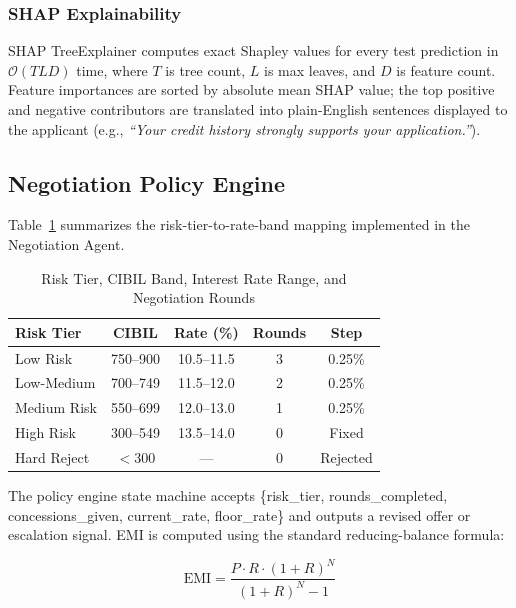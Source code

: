 \documentclass[conference]{IEEEtran}
\begin{document}
\subsubsection{SHAP Explainability}

SHAP TreeExplainer computes exact Shapley values for
every test prediction in $\mathcal{O}(TLD)$ time, where
$T$ is tree count, $L$ is max leaves, and $D$ is feature
count. Feature importances are sorted by absolute mean
SHAP value; the top positive and negative contributors
are translated into plain-English sentences displayed
to the applicant (e.g., \textit{``Your credit history
strongly supports your application.''}).

\subsection{Negotiation Policy Engine}

Table~\ref{tab:ratebands} summarizes the risk-tier-to-rate-band
mapping implemented in the Negotiation Agent.

\begin{table}[H]
\centering
\caption{Risk Tier, CIBIL Band, Interest Rate Range,
and Negotiation Rounds}
\label{tab:ratebands}
\renewcommand{\arraystretch}{1.15}
\begin{tabular}{@{}lcccc@{}}
\toprule
\textbf{Risk Tier} & \textbf{CIBIL} & \textbf{Rate (\%)} &
\textbf{Rounds} & \textbf{Step} \\
\midrule
Low Risk    & 750--900 & 10.5--11.5 & 3 & 0.25\% \\
Low-Medium  & 700--749 & 11.5--12.0 & 2 & 0.25\% \\
Medium Risk & 550--699 & 12.0--13.0 & 1 & 0.25\% \\
High Risk   & 300--549 & 13.5--14.0 & 0 & Fixed  \\
Hard Reject & $<$300   & ---        & 0 & Rejected \\
\bottomrule
\end{tabular}
\end{table}

\noindent The policy engine state machine accepts
\{risk\_tier, rounds\_completed, concessions\_given,
current\_rate, floor\_rate\} and outputs a revised
offer or escalation signal. EMI is computed using the
standard reducing-balance formula:

\begin{equation}
\text{EMI} = \frac{P \cdot R \cdot (1+R)^{N}}{(1+R)^{N}-1}
\label{eq:emi}
\end{equation}
\end{document}
